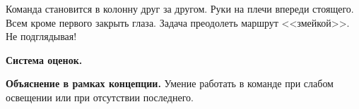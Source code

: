 
\par Команда становится в колонну друг за другом. Руки на плечи впереди стоящего. Всем кроме первого закрыть глаза. Задача преодолеть маршрут <<змейкой>>. Не подглядывая!

\par \textbf{Система оценок.}

\par \textbf{Объяснение в рамках концепции.} Умение работать в команде при слабом освещении или при отсутствии последнего.